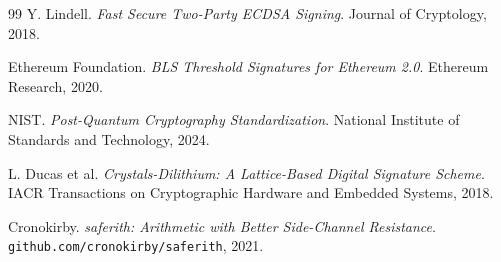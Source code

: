 \begin{thebibliography}{99}
Y. Lindell.
\textit{Fast Secure Two-Party ECDSA Signing}.
Journal of Cryptology, 2018.

Ethereum Foundation.
\textit{BLS Threshold Signatures for Ethereum 2.0}.
Ethereum Research, 2020.

NIST.
\textit{Post-Quantum Cryptography Standardization}.
National Institute of Standards and Technology, 2024.

L. Ducas et al.
\textit{Crystals-Dilithium: A Lattice-Based Digital Signature Scheme}.
IACR Transactions on Cryptographic Hardware and Embedded Systems, 2018.

Cronokirby.
\textit{saferith: Arithmetic with Better Side-Channel Resistance}.
\texttt{github.com/cronokirby/saferith}, 2021.

\end{thebibliography}

